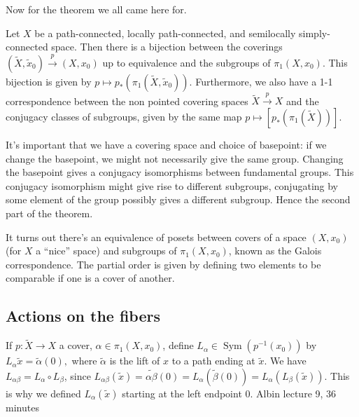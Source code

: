 Now for the theorem we all came here for.
\begin{theorem}\label{galois}
    Let $X$ be a path-connected, locally path-connected, and semilocally simply-connected space. Then there is a bijection between the coverings $(\widetilde X,\widetilde x_0) \overset{p}{\to }(X,x_0)$ up to equivalence and the subgroups of $\pi_1(X,x_0)$. This bijection is given by $p \mapsto p_*(\pi_1(\widetilde X,\widetilde x_0))$. Furthermore, we also have a 1-1 correspondence between the non pointed covering spaces $\widetilde X \overset{p}{\to }X$ and the conjugacy classes of subgroups, given by the same map  $p\mapsto [p_*(\pi_1(\widetilde X))]$.
\end{theorem}
It's important that we have a covering space and choice of basepoint: if we change the basepoint, we might not necessarily give the same group. Changing the basepoint gives a conjugacy isomorphisms between fundamental groups. This conjugacy isomorphism might give rise to different subgroups, conjugating by some element of the group possibly gives a different subgroup. Hence the second part of the theorem.

It turns out there's an equivalence of posets between covers of a space $(X,x_0)$ (for $X$ a ``nice'' space) and subgroups of $\pi_1(X,x_0)$, known as the Galois correspondence. The partial order is given by defining two elements to be comparable if one is a cover of another.
\subsection{Actions on the fibers}
If $p \colon \widetilde X \to X$ a cover, $\alpha \in \pi_1(X,x_0)$, define $L_{\alpha }\in \operatorname{Sym}(p^{-1}(x_0))$ by $L_{\alpha}\widetilde x=\widetilde \alpha (0),$ where $\widetilde \alpha $ is the lift of $x$ to a path ending at $\widetilde x$. We have $L_{\alpha \beta }=L_{\alpha }\circ L_{\beta }$, since $L_{\alpha \beta }(\widetilde x)=\widetilde{\alpha \beta }(0)=L_{\alpha }(\widetilde \beta(0))=L_{\alpha }(L_{\beta }(\widetilde x)).  $ This is why we defined $L_{\alpha }(\widetilde x)$ starting at the left endpoint $0$. Albin lecture 9, 36 minutes
